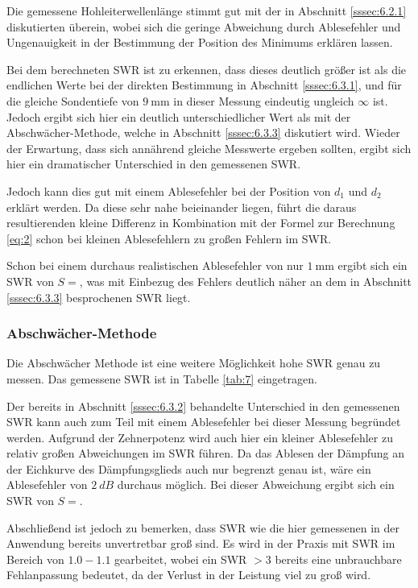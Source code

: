                 Die gemessene Hohleiterwellenlänge stimmt gut mit der in Abschnitt \ref{sssec:6.2.1} diskutierten überein, wobei sich die geringe Abweichung durch Ablesefehler und Ungenauigkeit in der Bestimmung der Position des Minimums erklären lassen.

                Bei dem berechneten SWR ist zu erkennen, dass dieses deutlich größer ist als die endlichen Werte bei der direkten Bestimmung in Abschnitt \ref{sssec:6.3.1}, und für die gleiche Sondentiefe von $\SI{9}{\milli\meter}$ in dieser Messung eindeutig ungleich $\infty$ ist.
                Jedoch ergibt sich hier ein deutlich unterschiedlicher Wert als mit der Abschwächer-Methode, welche in Abschnitt \ref{sssec:6.3.3} diskutiert wird.
                Wieder der Erwartung, dass sich annährend gleiche Messwerte ergeben sollten, ergibt sich hier ein dramatischer Unterschied in den gemessenen SWR.
                
                Jedoch kann dies gut mit einem Ablesefehler bei der Position von $d_1$ und $d_2$ erklärt werden.
                Da diese sehr nahe beieinander liegen, führt die daraus resultierenden kleine Differenz in Kombination mit der Formel zur Berechnung \eqref{eq:2} schon bei kleinen Ablesefehlern zu großen Fehlern im SWR.

                Schon bei einem durchaus realistischen Ablesefehler von nur $\SI{1}{\milli\meter}$ ergibt sich ein SWR von $S = $, was mit Einbezug des Fehlers deutlich näher an dem in Abschnitt \ref{sssec:6.3.3} besprochenen SWR liegt.

            \subsubsection{Abschwächer-Methode \label{sssec:6.3.3}}
                Die Abschwächer Methode ist eine weitere Möglichkeit hohe SWR genau zu messen.
                Das gemessene SWR ist in Tabelle \ref{tab:7} eingetragen.

                Der bereits in Abschnitt \ref{sssec:6.3.2} behandelte Unterschied in den gemessenen SWR kann auch zum Teil mit einem Ablesefehler bei dieser Messung begründet werden.
                Aufgrund der Zehnerpotenz wird auch hier ein kleiner Ablesefehler zu relativ großen Abweichungen im SWR führen.
                Da das Ablesen der Dämpfung an der Eichkurve des Dämpfungsglieds auch nur begrenzt genau ist, wäre ein Ablesefehler von $\SI{2}{dB}$ durchaus möglich.
                Bei dieser Abweichung ergibt sich ein SWR von $S = $.

                Abschließend ist jedoch zu bemerken, dass SWR wie die hier gemessenen in der Anwendung bereits unvertretbar groß sind.
                Es wird in der Praxis mit SWR im Bereich von $\num{1.0} - \num{1.1}$ gearbeitet, wobei ein SWR $>3$ bereits eine unbrauchbare Fehlanpassung bedeutet, da der Verlust in der Leistung viel zu groß wird.
            
\newpage
\nocite{jannachexperimente}
\nocite{mikroschaden}
\printbibliography

